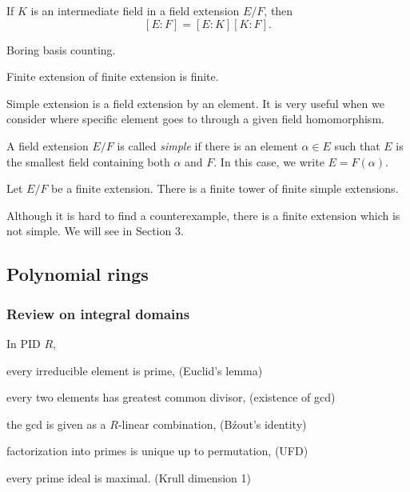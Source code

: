 \documentclass{../exp}
\begin{document}
\begin{thm}
If $K$ is an intermediate field in a field extension $E/F$, then
\[[E:F]=[E:K][K:F].\]
\end{thm}
\begin{pf}
Boring basis counting.
\end{pf}

\begin{cor}
Finite extension of finite extension is finite.
\end{cor}

Simple extension is a field extension by an element.
It is very useful when we consider where specific element goes to through a given field homomorphism.

\begin{defn}
A field extension $E/F$ is called \emph{simple} if there is an element $\alpha\in E$ such that $E$ is the smallest field containing both $\alpha$ and $F$.
In this case, we write $E=F(\alpha)$.
\end{defn}

\begin{lem}
Let $E/F$ be a finite extension.
There is a finite tower of finite simple extensions.
\end{lem}

Although it is hard to find a counterexample, there is a finite extension which is not simple.
We will see in Section 3.





\subsection{Polynomial rings}

\subsubsection{Review on integral domains}

\begin{prop}
In PID $R$,
\begin{cond}
\item every irreducible element is prime, \hfill(Euclid's lemma)
\item every two elements has greatest common divisor, \hfill(existence of gcd)
\item the gcd is given as a $R$-linear combination, \hfill(B\'zout's identity)
\item factorization into primes is unique up to permutation, \hfill(UFD)
\item every prime ideal is maximal. \hfill(Krull dimension 1)
\end{cond}
\end{prop}
\end{document}
